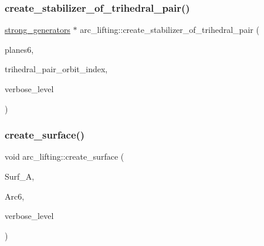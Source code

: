 \mbox{\label{classarc__lifting_a9dd6e280975225ec907f663f3335829a}} 
\subsubsection{\texorpdfstring{create\+\_\+stabilizer\+\_\+of\+\_\+trihedral\+\_\+pair()}{create\_stabilizer\_of\_trihedral\_pair()}}
{\footnotesize\ttfamily \mbox{\hyperlink{classstrong__generators}{strong\+\_\+generators}} $\ast$ arc\+\_\+lifting\+::create\+\_\+stabilizer\+\_\+of\+\_\+trihedral\+\_\+pair (\begin{DoxyParamCaption}\item[{\mbox{\hyperlink{galois_8h_a09fddde158a3a20bd2dcadb609de11dc}{I\+NT}} $\ast$}]{planes6,  }\item[{\mbox{\hyperlink{galois_8h_a09fddde158a3a20bd2dcadb609de11dc}{I\+NT}} \&}]{trihedral\+\_\+pair\+\_\+orbit\+\_\+index,  }\item[{\mbox{\hyperlink{galois_8h_a09fddde158a3a20bd2dcadb609de11dc}{I\+NT}}}]{verbose\+\_\+level }\end{DoxyParamCaption})}

\mbox{\label{classarc__lifting_a2b1fd46281de9ff3fef00fc122d39b2b}} 
\subsubsection{\texorpdfstring{create\+\_\+surface()}{create\_surface()}}
{\footnotesize\ttfamily void arc\+\_\+lifting\+::create\+\_\+surface (\begin{DoxyParamCaption}\item[{\mbox{\hyperlink{classsurface__with__action}{surface\+\_\+with\+\_\+action}} $\ast$}]{Surf\+\_\+A,  }\item[{\mbox{\hyperlink{galois_8h_a09fddde158a3a20bd2dcadb609de11dc}{I\+NT}} $\ast$}]{Arc6,  }\item[{\mbox{\hyperlink{galois_8h_a09fddde158a3a20bd2dcadb609de11dc}{I\+NT}}}]{verbose\+\_\+level }\end{DoxyParamCaption})}

